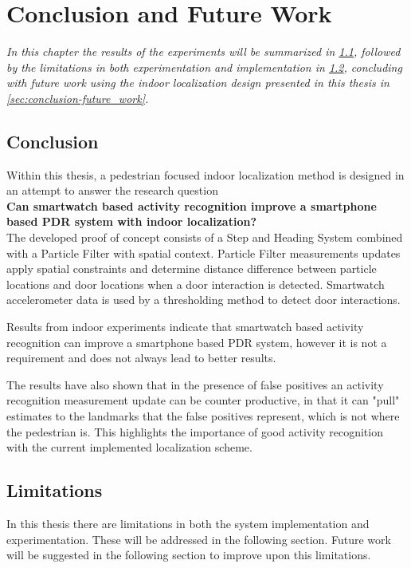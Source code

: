 \chapter{Conclusion and Future Work}
\textit{In this chapter the results of the experiments will be summarized in \cref{sec:conclusion-conclusion}, followed by the limitations in both experimentation and implementation in \cref{sec:conclusion-limitations}, concluding with future work using the indoor localization design presented in this thesis in \cref{sec:conclusion-future_work}.}


\section{Conclusion}
\label{sec:conclusion-conclusion}
Within this thesis, a pedestrian focused indoor localization method is designed in an attempt to answer the research question \\

\textbf{Can smartwatch based activity recognition improve a smartphone based \ac{PDR} system with indoor localization?} \\

The developed proof of concept consists of a Step and Heading System combined with a Particle Filter with spatial context. Particle Filter measurements updates apply spatial constraints and determine distance difference between particle locations and door locations when a door interaction is detected. Smartwatch accelerometer data is used by a thresholding method to detect door interactions. \par

Results from indoor experiments indicate that smartwatch based activity recognition can improve a smartphone based \ac{PDR} system, however it is not a requirement and does not always lead to better results. \par 

The results have also shown that in the presence of false positives an activity recognition measurement update can be counter productive, in that it can "pull" estimates to the landmarks that the false positives represent, which is not where the pedestrian is. This highlights the importance of good activity recognition with the current implemented localization scheme.

\section{Limitations}
\label{sec:conclusion-limitations}
In this thesis there are limitations in both the system implementation and  experimentation. These will be addressed in the following section. Future work will be suggested in the following section to improve upon this limitations.


